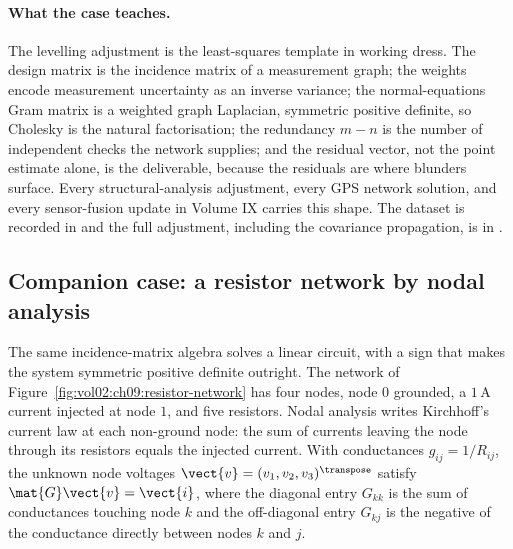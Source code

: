\paragraph{What the case teaches.}
The levelling adjustment is the least-squares template in working
dress. The design matrix is the incidence matrix of a measurement
graph; the weights encode measurement uncertainty as an inverse
variance; the normal-equations Gram matrix is a weighted graph
Laplacian, symmetric positive definite, so Cholesky is the natural
factorisation; the redundancy $m - n$ is the number of independent
checks the network supplies; and the residual vector, not the
point estimate alone, is the deliverable, because the residuals are
where blunders surface. Every structural-analysis adjustment, every
GPS network solution, and every sensor-fusion update in Volume IX
carries this shape. The dataset is recorded in
 and the full adjustment, including
the covariance propagation, is in .

\subsection{Companion case: a resistor network by nodal analysis}

The same incidence-matrix algebra solves a linear circuit, with a
sign that makes the system symmetric positive definite outright. The
network of Figure~\ref{fig:vol02:ch09:resistor-network} has four
nodes, node $0$ grounded, a $1\,\si{\ampere}$ current injected at
node $1$, and five resistors. Nodal analysis writes Kirchhoff's
current law at each non-ground node: the sum of currents leaving the
node through its resistors equals the injected current. With
conductances $g_{ij} = 1/R_{ij}$, the unknown node voltages
$\vect{v} = (v_{1}, v_{2}, v_{3})^{\transpose}$ satisfy $\mat{G}
\vect{v} = \vect{i}$, where the diagonal entry $G_{kk}$ is the sum of
conductances touching node $k$ and the off-diagonal entry $G_{kj}$ is
the negative of the conductance directly between nodes $k$ and $j$.



